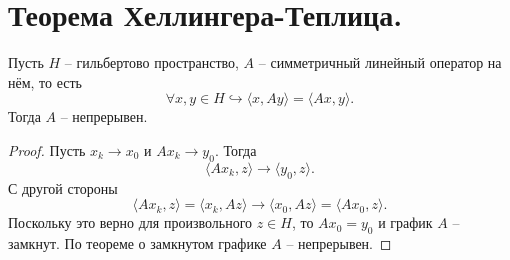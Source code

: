 \section{Теорема Хеллингера-Теплица.}
\begin{theorem}
    Пусть $H$ -- гильбертово пространство, $A$ -- симметричный линейный оператор на нём, то есть
    \[
        \forall x, y \in H \hookrightarrow \langle x, Ay \rangle = \langle Ax, y \rangle.
    \]
    Тогда $A$ -- непрерывен.
\end{theorem}
\begin{proof}
    Пусть $x_k \rightarrow x_0$ и $Ax_k \rightarrow y_0$.
    Тогда
    \[
        \langle Ax_{k}, z \rangle \rightarrow \langle y_0, z \rangle.
    \]
    С другой стороны
    \[
        \langle Ax_{k}, z \rangle = \langle x_{k}, Az \rangle \rightarrow \langle x_0, Az \rangle = \langle Ax_0, z \rangle.
    \]
    Поскольку это верно для произвольного $z \in H$, то $Ax_0 = y_0$ и график $A$ -- замкнут.
    По теореме о замкнутом графике $A$ -- непрерывен.
\end{proof}